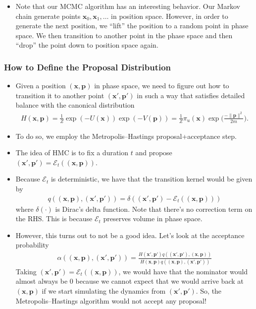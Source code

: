 \documentclass[10pt]{article}
\newcommand{\ve}[1]{\mathbf{#1}}
\newcommand{\mcal}[1]{\mathcal{#1}}
\begin{document}
\begin{itemize}
  \item Note that our MCMC algorithm has an interesting behavior. Our Markov chain generate points $\ve{x}_0, \ve{x}_1, \dotsc$ in position space. However, in order to generate the next position, we ``lift'' the position to a random point in phase space. We then transition to another point in the phase space and then ``drop'' the point down to position space again.
\end{itemize}

\subsubsection{How to Define the Proposal Distribution}

\begin{itemize}
  \item Given a position $(\ve{x},\ve{p})$ in phase space, we need to figure out how to transition it to another point $(\ve{x}',\ve{p}')$ in such a way that satisfies detailed balance with the canonical distribution
  \begin{align*}
    H(\ve{x},\ve{p}) = \frac{1}{Z} \exp(-U(\ve{x}))\exp(-V(\ve{p})) = \frac{1}{Z} \pi_u(\ve{x}) \exp\bigg( \frac{-\| \ve{p} \|^2}{2m} \bigg).
  \end{align*}
  
  \item To do so, we employ the Metropolis--Hastings proposal+acceptance step.

  \item The idea of HMC is to fix a duration $t$ and propose $(\ve{x}',\ve{p}') = \mcal{E}_t((\ve{x},\ve{p}))$.
  
  \item Because $\mcal{E}_t$ is deterministic, we have that the transition kernel would be given by
  \begin{align*}
    q((\ve{x},\ve{p}), (\ve{x}',\ve{p}')) = \delta((\ve{x}',\ve{p}') - \mcal{E}_t((\ve{x},\ve{p})))
  \end{align*}
  where $\delta(\cdot)$ is Dirac's delta function. Note that there's no correction term on the RHS. This is because $\mcal{E}_t$ preserves volume in phase space.

  \item However, this turns out to not be a good idea. Let's look at the acceptance probability
  \begin{align*}
    \alpha((\ve{x},\ve{p}), (\ve{x}',\ve{p}')) = \frac{H(\ve{x}',\ve{p}') q((\ve{x'},\ve{p}'),(\ve{x},\ve{p}))}{H(\ve{x},\ve{p})q((\ve{x},\ve{p}),(\ve{x}',\ve{p}'))}
  \end{align*}
  Taking $(\ve{x}',\ve{p}') = \mcal{E}_t((\ve{x},\ve{p}))$, we would have that the nominator would almost always be $0$ because we cannot expect that we would arrive back at $(\ve{x},\ve{p})$ if we start simulating the dynamics from $(\ve{x}',\ve{p}')$. So, the Metropolis--Hastings algorithm would not accept any proposal!
  

\end{itemize}
\end{document}
